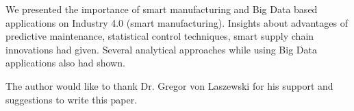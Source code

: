 \documentclass[sigconf]{acmart}
\begin{document}
We presented the importance of smart manufacturing and Big Data based applications on Industry 4.0 (smart manufacturing). Insights about advantages of predictive maintenance, statistical control techniques, smart supply chain innovations had given. Several analytical approaches while using Big Data applications also had shown.

\begin{acks}

The author would like to thank Dr. Gregor von Laszewski for his support and suggestions to write this paper.

\end{acks}


 
\end{document}
